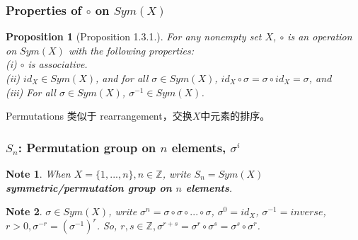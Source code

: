 \documentclass[11pt,a4paper]{article}
\newtheorem{proposition}{Proposition}
\newtheorem{note}{Note}
\begin{document}
\subsubsection{Properties of $\circ$ on $Sym(X)$}
\begin{proposition}[Proposition 1.3.1.]
    For any nonempty set $X$, $\circ$ is an operation on $Sym(X)$ with the following properties:\\
(i) $\circ$ is associative.\\
(ii) $id_X\in Sym(X)$, and for all $\sigma \in Sym(X)$, $id_X\circ\sigma=\sigma\circ id_X=\sigma$, and\\
(iii) For all $\sigma \in Sym(X)$, $\sigma^{-1} \in Sym(X)$.
\end{proposition}
Permutations 类似于 rearrangement，交换$X$中元素的排序。

\subsubsection{$S_n$: Permutation group on $n$ elements, $\sigma^i$}
\begin{note}
    When $X=\{1,...,n \}, n\in \mathbb{Z}$, write $S_n=Sym(X)$ \textbf{symmetric/permutation group on $n$ elements}.
\end{note}
\begin{note}
    $\sigma \in Sym(X)$, write $\sigma^n=\sigma\circ\sigma\circ...\circ\sigma$, $\sigma^0=id_X$, $\sigma^{-1}=inverse$, $r>0, \sigma^{-r}=(\sigma^{-1})^r$. So, $r,s\in \mathbb{Z}, \sigma^{r+s}=\sigma^r\circ\sigma^s=\sigma^s\circ\sigma^r$.
\end{note}
\end{document}
